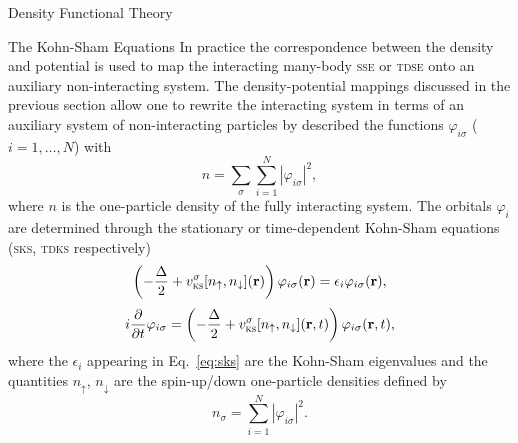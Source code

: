 \documentclass[letterpaper, 10 pt]{report}
\begin{document}
\begin{chapter}{Density Functional Theory \label{chap:dft}}
\begin{section}{The Kohn-Sham Equations \label{sec:ks}}
      In practice the correspondence between the density and potential is used to map the interacting
      many-body \textsc{sse} or \textsc{tdse} onto an auxiliary non-interacting system. The
      density-potential mappings discussed in the previous section allow one to rewrite the interacting
      system in terms of an auxiliary system of non-interacting particles by described the functions
      $\varphi_{i\sigma}$ ($i = 1, \dots, N$) with
      \begin{equation} \label{eq:dendef2}
         n = \sum\limits_{\sigma} \sum\limits_{i = 1}^N
                           \left| \varphi_{i\sigma} \right|^2,
      \end{equation}
      where $n$ is the one-particle density of the fully interacting system. The orbitals $\varphi_i$
      are determined through the stationary or time-dependent Kohn-Sham equations~\cite{ks-eq,
      spin-dep1, spin-dep3} (\textsc{sks}, \textsc{tdks} respectively)
      \begin{equation} \label{eq:sks}
         \left( -\frac{\Delta}{2} + v^\sigma_\mathrm{\textsc{ks}}[n_\uparrow,
         n_\downarrow](\mathbf{r}) \right)
          \varphi_{i\sigma}(\mathbf{r}) = \epsilon_i \varphi_{i \sigma}(\mathbf{r}),
      \end{equation}
      \begin{equation} \label{eq:tdks}
         i \frac{\partial}{\partial t} \varphi_{i\sigma} = 
            \left( -\frac{\Delta}{2} +
            v^\sigma_\mathrm{\textsc{ks}}[n_\uparrow, n_\downarrow](\mathbf{r},t)
            \right) \varphi_{i\sigma}(\mathbf{r},t),
      \end{equation}
      where the $\epsilon_i$ appearing in Eq.~\eqref{eq:sks} are the Kohn-Sham eigenvalues and the
      quantities $n_\uparrow$, $n_\downarrow$ are the spin-up/down one-particle densities defined by
      \begin{equation} \label{eq:spinden}
         n_\sigma = \sum\limits_{i=1}^{N} \left| \varphi_{i\sigma} \right|^2.
      \end{equation}


\end{section}
\end{chapter}
\end{document}
